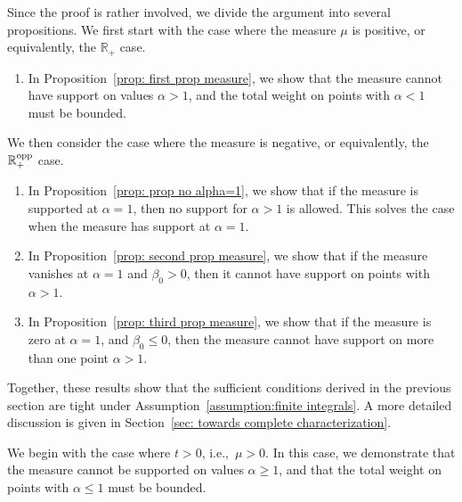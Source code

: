 \documentclass[aps,pra,11pt,onecolumn,nofootinbib,tightenlines]{revtex4-2}
\theoremstyle{definition}
\begin{document}
Since the proof is rather involved, we divide the argument into several propositions.
We first start with the case where the measure $\mu$ is positive, or equivalently, the $\mathbb{R}_+$ case.
\begin{enumerate}
    \item In Proposition~\ref{prop: first prop measure}, we show that the measure cannot have support on values $\alpha > 1$, and the total weight on points with $\alpha < 1$ must be bounded.
\end{enumerate}
We then consider the case where the measure is negative, or equivalently, the $\mathbb{R}^{\rm opp}_+$ case.
\begin{enumerate}
    \item In Proposition~\ref{prop: prop no alpha=1}, we show that if the measure is supported at $\alpha=1$, then no support for $\alpha>1$ is allowed. This solves the case when the measure has support at $\alpha=1$.
    \item In Proposition~\ref{prop: second prop measure}, we show that if the measure vanishes at $\alpha=1$ and $\beta_0>0$, then it cannot have support on points with $\alpha>1$.
    \item In Proposition~\ref{prop: third prop measure}, we show that if the measure is zero at $\alpha=1$, and $\beta_0\leq 0$, then the measure cannot have support on more than one point $\alpha>1$.
\end{enumerate}
Together, these results show that the sufficient conditions derived in the previous section are tight under Assumption~\ref{assumption:finite integrals}. A more detailed discussion is given in Section~\ref{sec: towards complete characterization}.


\bigskip






We begin with the case where $t>0$, i.e.,\ $\mu>0$. In this case, we demonstrate that the measure cannot be supported on values $\alpha \geq 1$, and that the total weight on points with $\alpha \leq 1$ must be bounded.
\end{document}
